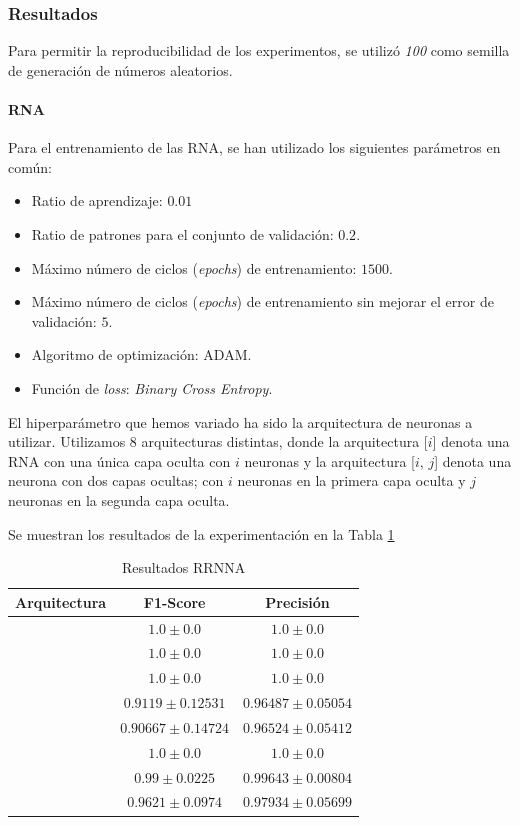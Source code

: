 \documentclass[12pt]{article}
\begin{document}
\subsubsection{Resultados}
Para permitir la reproducibilidad de los experimentos, se utilizó \textit{100} como semilla de generación de números
aleatorios.

\paragraph{RNA}

Para el entrenamiento de las RNA, se han utilizado los siguientes parámetros en común:
\begin{itemize}
	\item Ratio de aprendizaje: $0.01$
	\item Ratio de patrones para el conjunto de validación: $0.2$.
	\item Máximo número de ciclos (\textit{epochs}) de entrenamiento: $1500$.
	\item Máximo número de ciclos (\textit{epochs}) de entrenamiento sin mejorar el error de validación: $5$.
	\item Algoritmo de optimización: ADAM.
	\item Función de \textit{loss}: \textit{Binary Cross Entropy}.
\end{itemize}
El hiperparámetro que hemos variado ha sido la arquitectura de neuronas a utilizar. Utilizamos 8 arquitecturas distintas,
donde la arquitectura [$i$] denota una RNA con una única capa oculta con $i$ neuronas y la arquitectura [$i$, $j$] 
denota una neurona con dos capas ocultas; con $i$ neuronas en la primera capa oculta y $j$ neuronas en la segunda capa oculta.

Se muestran los resultados de la experimentación en la Tabla \ref{Tab:ANN_1}

\begin{table}[ht]
	\caption{Resultados RRNNA}
	\centering
		 \begin{tabular}{||c c c||}
			 \hline
			 Arquitectura & F1-Score & Precisión  \\ [0.5ex]
			 \hline\hline
			 [2] & $1.0 \pm 0.0$ & $1.0 \pm 0.0$ \\
			 \hline
			 [4] & $1.0 \pm 0.0$ & $1.0 \pm 0.0$ \\
			 \hline
			 [8] & $1.0 \pm 0.0$ & $1.0 \pm 0.0$ \\
			 \hline
			 [2, 4] & $0.9119 \pm 0.12531$ & $0.96487 \pm 0.05054$ \\
			 \hline
			 [2, 8] & $0.90667 \pm 0.14724$ & $0.96524 \pm 0.05412$ \\
			 \hline
			 [4, 2] & $1.0 \pm 0.0$ & $1.0 \pm 0.0$ \\
			 \hline
			 [4, 4] & $0.99 \pm 0.0225$ & $0.99643 \pm 0.00804$ \\
			 \hline
			 [4, 8] & $0.9621 \pm 0.0974$ & $0.97934 \pm 0.05699$ \\
			 \hline
		 \end{tabular}
	\label{Tab:ANN_1}
\end{table}
\end{document}

